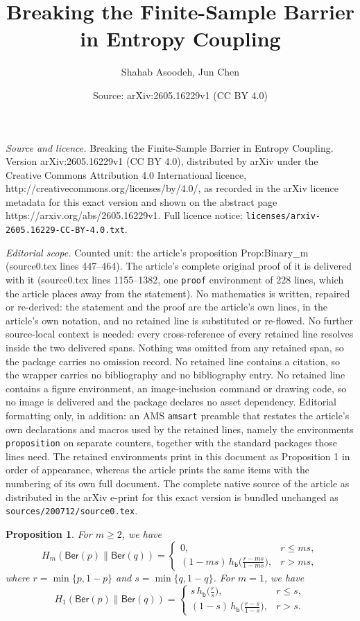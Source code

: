 \documentclass[10pt,a4paper]{amsart}
\title{Breaking the Finite-Sample Barrier in Entropy Coupling}
\author{Shahab Asoodeh, Jun Chen}
\date{Source: arXiv:2605.16229v1 (CC BY 4.0)}
\newtheorem{proposition}{Proposition}
\newcommand{\Ber}{\mathsf{Ber}}
\begin{document}
\maketitle

\noindent\emph{Source and licence.} Breaking the Finite-Sample Barrier in Entropy Coupling. Version arXiv:2605.16229v1 (CC BY 4.0), distributed by arXiv under the Creative Commons Attribution 4.0 International licence, http://creativecommons.org/licenses/by/4.0/, as recorded in the arXiv licence metadata for this exact version and shown on the abstract page https://arxiv.org/abs/2605.16229v1. Full licence notice: \texttt{licenses/arxiv-2605.16229-CC-BY-4.0.txt}.\par\smallskip

\noindent\textit{Editorial scope.} Counted unit: the article's proposition Prop:Binary\_m (source0.tex lines 447--464). The article's complete original proof of it is delivered with it (source0.tex lines 1155--1382, one \texttt{proof} environment of 228 lines, which the article places away from the statement). No mathematics is written, repaired or re-derived: the statement and the proof are the article's own lines, in the article's own notation, and no retained line is substituted or re-flowed.  No further source-local context is needed: every cross-reference of every retained line resolves inside the two delivered spans.  Nothing was omitted from any retained span, so the package carries no omission record.  No retained line contains a citation, so the wrapper carries no bibliography and no bibliography entry.  No retained line contains a figure environment, an image-inclusion command or drawing code, so no image is delivered and the package declares no asset dependency.  Editorial formatting only, in addition: an AMS \texttt{amsart} preamble that restates the article's own declarations and macros used by the retained lines, namely the environments \texttt{proposition} on separate counters, together with the standard packages those lines need.  The retained environments print in this document as Proposition 1 in order of appearance, whereas the article prints the same items with the numbering of its own full document.  The complete native source of the article as distributed in the arXiv e-print for this exact version is bundled unchanged as \texttt{sources/200712/source0.tex}.
\begin{proposition}\label{Prop:Binary_m}
For $m\ge2$, we have
$$
H_m(\Ber(p)\|\Ber(q)) =
\begin{cases}
0, & r \le m s,\\
(1-ms)\,h_{\mathsf b}\!\big(\frac{r-ms}{1-ms}\big), & r>ms,
\end{cases}
$$
where $r=\min\{p,1-p\}$ and $s=\min\{q,1-q\}$. For $m=1$, we have
$$
H_1(\Ber(p)\|\Ber(q)) =
\begin{cases}
s\,h_{\mathsf b}\!\big(\frac{r}{s}\big), & r\le s,\\
(1-s)\,h_{\mathsf b}\!\big(\frac{r-s}{1-s}\big), & r>s.
\end{cases}
$$
\end{proposition}
\end{document}
